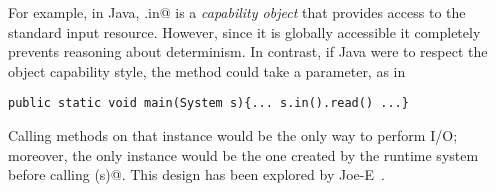 


\lstset{language=Java}
 For example, in Java, \Q@System.in@%
 \lstset{language=FortyTwo}
 is a \emph{capability object} that provides access to the standard input resource. However, since it is globally accessible it completely prevents reasoning about determinism. 
In contrast, if Java were to respect the object capability style, the \Q@main@ method could take a \Q@System@ parameter, as in
\lstset{language=Java}
\begin{lstlisting}
public static void main(System s){... s.in().read() ...}
\end{lstlisting}
\lstset{language=FortyTwo}
Calling methods on that \Q@System@ instance would be the only way to perform I/O;
moreover, the only \Q@System@ instance would be the one created by the runtime system before calling \Q@main(s)@. %
This design has been explored by Joe-E~\cite{finifter2008verifiable}.



